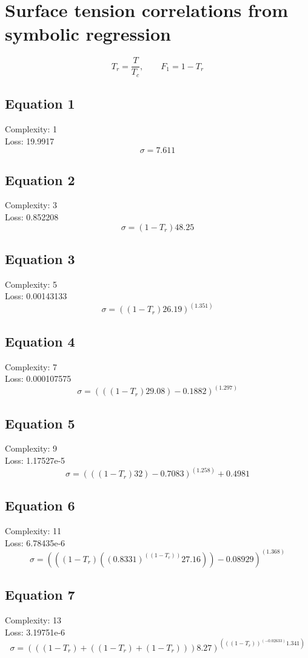 \documentclass[11pt]{article}
\begin{document}
\section*{Surface tension correlations from symbolic regression}
\[ T_r = \frac{T}{T_c}, \qquad F_1 = 1 - T_r \]

\subsection*{Equation 1}
Complexity: 1\\
Loss: 19.9917
\[
\sigma = 7.611
\]

\subsection*{Equation 2}
Complexity: 3\\
Loss: 0.852208
\[
\sigma = (1 - T_r) 48.25
\]

\subsection*{Equation 3}
Complexity: 5\\
Loss: 0.00143133
\[
\sigma = ((1 - T_r) 26.19)^(1.351)
\]

\subsection*{Equation 4}
Complexity: 7\\
Loss: 0.000107575
\[
\sigma = (((1 - T_r) 29.08) - 0.1882)^(1.297)
\]

\subsection*{Equation 5}
Complexity: 9\\
Loss: 1.17527e-5
\[
\sigma = (((1 - T_r) 32) - 0.7083)^(1.258) + 0.4981
\]

\subsection*{Equation 6}
Complexity: 11\\
Loss: 6.78435e-6
\[
\sigma = (((1 - T_r) ((0.8331)^((1 - T_r)) 27.16)) - 0.08929)^(1.368)
\]

\subsection*{Equation 7}
Complexity: 13\\
Loss: 3.19751e-6
\[
\sigma = (((1 - T_r) + ((1 - T_r) + (1 - T_r))) 8.27)^(((1 - T_r))^(-0.02633) 1.341)
\]
\end{document}
